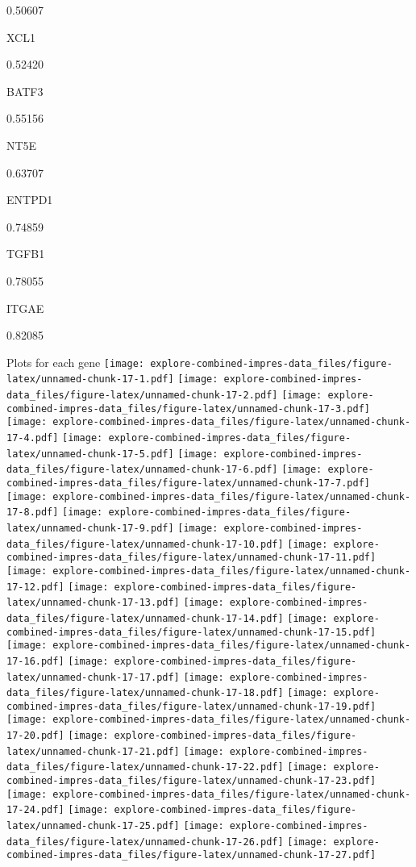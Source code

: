 \documentclass[]{article}
\begin{document}
0.50607

XCL1

0.52420

BATF3

0.55156

NT5E

0.63707

ENTPD1

0.74859

TGFB1

0.78055

ITGAE

0.82085

Plots for each gene
\texttt{[image: explore-combined-impres-data\_files/figure-latex/unnamed-chunk-17-1.pdf]}
\texttt{[image: explore-combined-impres-data\_files/figure-latex/unnamed-chunk-17-2.pdf]}
\texttt{[image: explore-combined-impres-data\_files/figure-latex/unnamed-chunk-17-3.pdf]}
\texttt{[image: explore-combined-impres-data\_files/figure-latex/unnamed-chunk-17-4.pdf]}
\texttt{[image: explore-combined-impres-data\_files/figure-latex/unnamed-chunk-17-5.pdf]}
\texttt{[image: explore-combined-impres-data\_files/figure-latex/unnamed-chunk-17-6.pdf]}
\texttt{[image: explore-combined-impres-data\_files/figure-latex/unnamed-chunk-17-7.pdf]}
\texttt{[image: explore-combined-impres-data\_files/figure-latex/unnamed-chunk-17-8.pdf]}
\texttt{[image: explore-combined-impres-data\_files/figure-latex/unnamed-chunk-17-9.pdf]}
\texttt{[image: explore-combined-impres-data\_files/figure-latex/unnamed-chunk-17-10.pdf]}
\texttt{[image: explore-combined-impres-data\_files/figure-latex/unnamed-chunk-17-11.pdf]}
\texttt{[image: explore-combined-impres-data\_files/figure-latex/unnamed-chunk-17-12.pdf]}
\texttt{[image: explore-combined-impres-data\_files/figure-latex/unnamed-chunk-17-13.pdf]}
\texttt{[image: explore-combined-impres-data\_files/figure-latex/unnamed-chunk-17-14.pdf]}
\texttt{[image: explore-combined-impres-data\_files/figure-latex/unnamed-chunk-17-15.pdf]}
\texttt{[image: explore-combined-impres-data\_files/figure-latex/unnamed-chunk-17-16.pdf]}
\texttt{[image: explore-combined-impres-data\_files/figure-latex/unnamed-chunk-17-17.pdf]}
\texttt{[image: explore-combined-impres-data\_files/figure-latex/unnamed-chunk-17-18.pdf]}
\texttt{[image: explore-combined-impres-data\_files/figure-latex/unnamed-chunk-17-19.pdf]}
\texttt{[image: explore-combined-impres-data\_files/figure-latex/unnamed-chunk-17-20.pdf]}
\texttt{[image: explore-combined-impres-data\_files/figure-latex/unnamed-chunk-17-21.pdf]}
\texttt{[image: explore-combined-impres-data\_files/figure-latex/unnamed-chunk-17-22.pdf]}
\texttt{[image: explore-combined-impres-data\_files/figure-latex/unnamed-chunk-17-23.pdf]}
\texttt{[image: explore-combined-impres-data\_files/figure-latex/unnamed-chunk-17-24.pdf]}
\texttt{[image: explore-combined-impres-data\_files/figure-latex/unnamed-chunk-17-25.pdf]}
\texttt{[image: explore-combined-impres-data\_files/figure-latex/unnamed-chunk-17-26.pdf]}
\texttt{[image: explore-combined-impres-data\_files/figure-latex/unnamed-chunk-17-27.pdf]}
\end{document}
